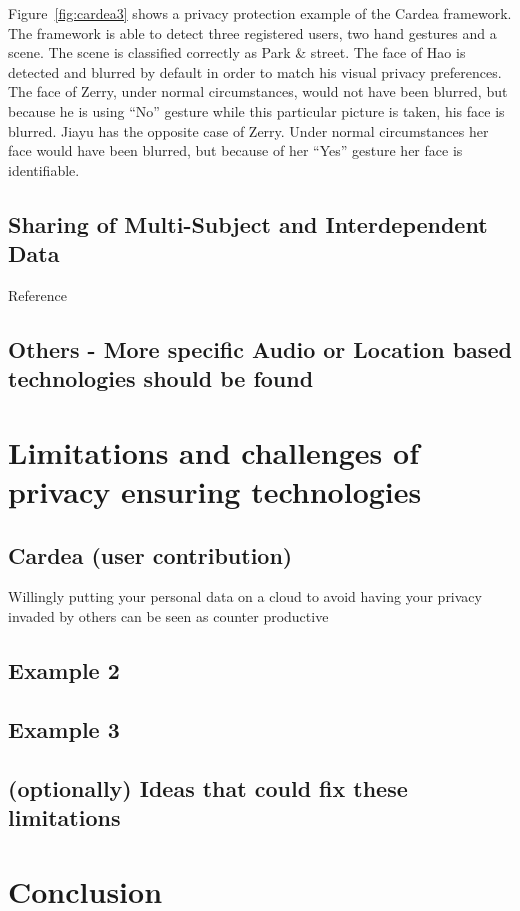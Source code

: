 \documentclass[conference]{IEEEtran}
\begin{document}
Figure~\ref{fig:cardea3} shows a privacy protection example of the Cardea framework. The framework is able to detect three registered users, two hand gestures and a scene. The scene is classified correctly as Park \& street. The face of Hao is detected and blurred by default in order to match his visual privacy preferences. The face of Zerry, under normal circumstances, would not have been blurred, but because he is using “No” gesture while this particular picture is taken, his face is blurred. Jiayu has the opposite case of Zerry. Under normal circumstances her face would have been blurred, but because of her “Yes” gesture her face is identifiable.



\subsection{Sharing of Multi-Subject and Interdependent Data}
Reference \cite{olteanu2018consensual}


\subsection{Others - More specific Audio or Location based technologies should be found}


\section{Limitations and challenges of privacy ensuring technologies}\label{Limitations}
\subsection{Cardea (user contribution)}
Willingly putting your personal data on a cloud to avoid having your privacy invaded by others can be seen as counter productive
\subsection{Example 2}
\subsection{Example 3}
\subsection{(optionally) Ideas that could fix these limitations}

\section{Conclusion}\label{Conclusion}
\end{document}
